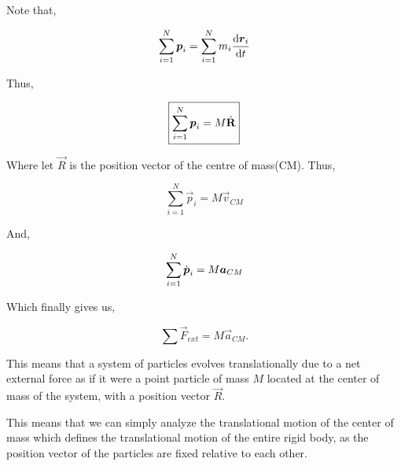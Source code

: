Note that, 

\begin{equation*}
    \sum_{i=1}^N \boldsymbol{p}_i = \sum_{i=1}^N m_i \dv{\boldsymbol{r}_i}{t}
\end{equation*}

Thus,

\begin{equation}
    \boxed{\sum_{i=1}^N \boldsymbol{p}_i = M\dot{\mathbf{R}}}
\end{equation}

Where let \(\vec{R}\) is the position vector of the centre of mass(CM). Thus, 

\begin{equation*}
    {\sum_{i=1}^N \vec{p}_i = M\vec{v}_{CM}}
\end{equation*}

And, 

\begin{equation*}
    {\sum_{i=1}^N \dot{\boldsymbol{p}}_i = M\boldsymbol{a}_{CM}}
\end{equation*}

Which finally gives us,

\begin{equation}
    \boxed{\sum \Vec{F}_{ext} = M\vec{a}_{CM}.}
\end{equation}

This means that a system of particles evolves translationally due to a net external force as if
it were a point particle of mass \(M\) located at the center of mass of the system, with 
a position vector \(\Vec{R}\).

This means that we can simply analyze the translational motion of the center of mass which 
defines the translational motion of the entire rigid body, as the 
position vector of the particles are fixed relative to each other.